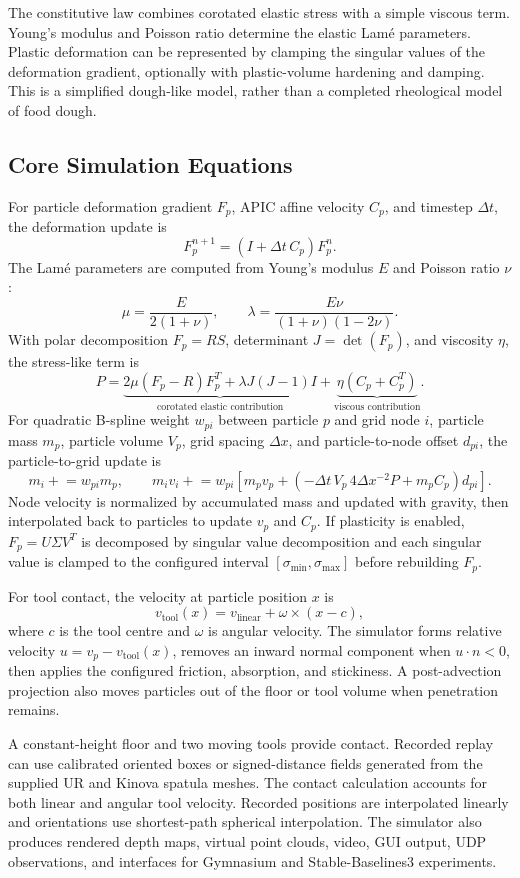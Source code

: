 \documentclass[10pt,a4paper]{article}
\begin{document}
The constitutive law combines corotated elastic stress with a simple viscous term. Young's modulus and Poisson ratio determine the elastic Lam\'e parameters. Plastic deformation can be represented by clamping the singular values of the deformation gradient, optionally with plastic-volume hardening and damping. This is a simplified dough-like model, rather than a completed rheological model of food dough.

\subsection*{Core Simulation Equations}

For particle deformation gradient $F_p$, APIC affine velocity $C_p$, and timestep $\Delta t$, the deformation update is
\[
F_p^{n+1}=(I+\Delta t\,C_p)F_p^n.
\]
The Lam\'e parameters are computed from Young's modulus $E$ and Poisson ratio $\nu$:
\[
\mu=\frac{E}{2(1+\nu)},\qquad \lambda=\frac{E\nu}{(1+\nu)(1-2\nu)}.
\]
With polar decomposition $F_p=RS$, determinant $J=\det(F_p)$, and viscosity $\eta$, the stress-like term is
\[
P=\underbrace{2\mu(F_p-R)F_p^T+\lambda J(J-1)I}_{\text{corotated elastic contribution}}+\underbrace{\eta(C_p+C_p^T)}_{\text{viscous contribution}}.
\]
For quadratic B-spline weight $w_{pi}$ between particle $p$ and grid node $i$, particle mass $m_p$, particle volume $V_p$, grid spacing $\Delta x$, and particle-to-node offset $d_{pi}$, the particle-to-grid update is
\[
m_i\mathrel{+}=w_{pi}m_p,\qquad
m_iv_i\mathrel{+}=w_{pi}\left[m_pv_p+\left(-\Delta t\,V_p\,4\Delta x^{-2}P+m_pC_p\right)d_{pi}\right].
\]
Node velocity is normalized by accumulated mass and updated with gravity, then interpolated back to particles to update $v_p$ and $C_p$. If plasticity is enabled, $F_p=U\Sigma V^T$ is decomposed by singular value decomposition and each singular value is clamped to the configured interval $[\sigma_{\min},\sigma_{\max}]$ before rebuilding $F_p$.

For tool contact, the velocity at particle position $x$ is
\[
v_{\mathrm{tool}}(x)=v_{\mathrm{linear}}+\omega\times(x-c),
\]
where $c$ is the tool centre and $\omega$ is angular velocity. The simulator forms relative velocity $u=v_p-v_{\mathrm{tool}}(x)$, removes an inward normal component when $u\cdot n<0$, then applies the configured friction, absorption, and stickiness. A post-advection projection also moves particles out of the floor or tool volume when penetration remains.

A constant-height floor and two moving tools provide contact. Recorded replay can use calibrated oriented boxes or signed-distance fields generated from the supplied UR and Kinova spatula meshes. The contact calculation accounts for both linear and angular tool velocity. Recorded positions are interpolated linearly and orientations use shortest-path spherical interpolation. The simulator also produces rendered depth maps, virtual point clouds, video, GUI output, UDP observations, and interfaces for Gymnasium and Stable-Baselines3 experiments.
\end{document}

